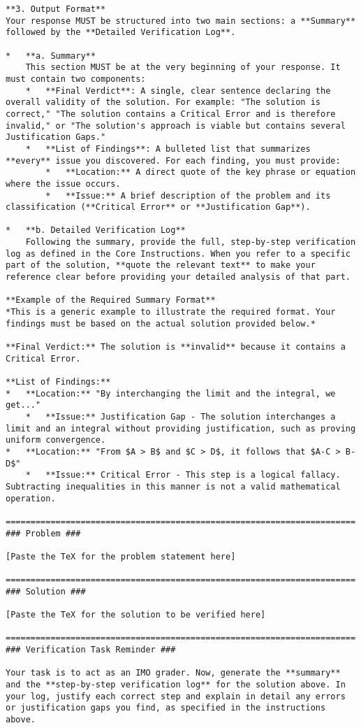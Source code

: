 \documentclass[12pt]{article}
\begin{document}
\begin{lstlisting}
**3. Output Format**
Your response MUST be structured into two main sections: a **Summary** followed by the **Detailed Verification Log**.

*   **a. Summary**
    This section MUST be at the very beginning of your response. It must contain two components:
    *   **Final Verdict**: A single, clear sentence declaring the overall validity of the solution. For example: "The solution is correct," "The solution contains a Critical Error and is therefore invalid," or "The solution's approach is viable but contains several Justification Gaps."
    *   **List of Findings**: A bulleted list that summarizes **every** issue you discovered. For each finding, you must provide:
        *   **Location:** A direct quote of the key phrase or equation where the issue occurs.
        *   **Issue:** A brief description of the problem and its classification (**Critical Error** or **Justification Gap**).

*   **b. Detailed Verification Log**
    Following the summary, provide the full, step-by-step verification log as defined in the Core Instructions. When you refer to a specific part of the solution, **quote the relevant text** to make your reference clear before providing your detailed analysis of that part.

**Example of the Required Summary Format**
*This is a generic example to illustrate the required format. Your findings must be based on the actual solution provided below.*

**Final Verdict:** The solution is **invalid** because it contains a Critical Error.

**List of Findings:**
*   **Location:** "By interchanging the limit and the integral, we get..."
    *   **Issue:** Justification Gap - The solution interchanges a limit and an integral without providing justification, such as proving uniform convergence.
*   **Location:** "From $A > B$ and $C > D$, it follows that $A-C > B-D$"
    *   **Issue:** Critical Error - This step is a logical fallacy. Subtracting inequalities in this manner is not a valid mathematical operation.

======================================================================
### Problem ###

[Paste the TeX for the problem statement here]

======================================================================
### Solution ###

[Paste the TeX for the solution to be verified here]

======================================================================
### Verification Task Reminder ###

Your task is to act as an IMO grader. Now, generate the **summary** and the **step-by-step verification log** for the solution above. In your log, justify each correct step and explain in detail any errors or justification gaps you find, as specified in the instructions above.
\end{lstlisting}
\end{document}
